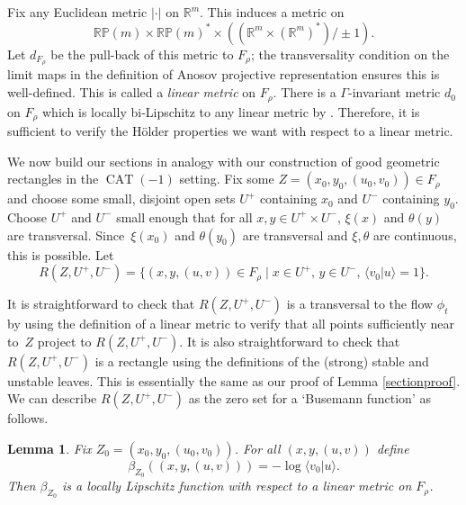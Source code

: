 \documentclass[10pt]{amsart}
\let\sep\mid
\newtheorem{lem}[thm]{Lemma}
\theoremstyle{definition}
\numberwithin{equation}{section}
\DeclareMathOperator{\CAT}{CAT}
\begin{document}
Fix any Euclidean metric $|\cdot|$ on $\mathbb{R}^m$. This induces a metric on\vspace*{-3pt}\enlargethispage{\baselineskip}%
\[ \mathbb{RP}(m) \times \mathbb{RP}(m)^* \times ((\mathbb{R}^m \times (\mathbb{R}^m)^*)/\pm1).\]
Let $d_{F_\rho}$ be the pull-back of this metric to $F_\rho$; the transversality condition on the limit maps in the definition of Anosov projective representation ensures this is well-defined. This is called a \emph{linear metric} on $F_\rho$. There is a $\Gamma$-invariant metric $d_0$ on $F_\rho$ which is locally bi-Lipschitz to any linear metric by \cite[Lem.\,5.2]{bcls}. Therefore, it is sufficient to verify the Hölder properties we want with respect to a linear metric.

We now build our sections in analogy with our construction of good geometric rectangles in the $\CAT(-1)$ setting. Fix some $Z = (x_0,y_0,(u_0,v_0)) \in F_\rho$ and choose some small, disjoint open sets $U^+$ containing $x_0$ and $U^-$ containing $y_0$. Choose $U^+$ and $U^-$ small enough that for all $x,y\in U^+\times U^-$, $\xi(x)$ and $\theta(y)$ are transversal. Since~$\xi(x_0)$ and $\theta(y_0)$ are transversal and $\xi, \theta$ are continuous, this is possible.
Let
\[ R(Z,U^+,U^-) = \{ (x,y,(u,v))\in F_\rho \sep x\in U^+,\, y\in U^-,\, \langle v_0 | u \rangle =1\}.\]

It is straightforward to check that $R(Z,U^+,U^-)$ is a transversal to the flow $\phi_t$ by using the definition of a linear metric to verify that all points sufficiently near to~$Z$ project to $R(Z,U^+,U^-)$. It is also straightforward to check that $R(Z,U^+,U^-)$ is a rectangle using the definitions of the (strong) stable and unstable leaves. This is essentially the same as our proof of Lemma \ref{sectionproof}. We can describe $R(Z,U^+,U^-)$ as the zero set for a `Busemann function' as follows.

\begin{lem}\label{lem:beta Lipschitz}
Fix $Z_0=(x_0,y_0,(u_0,v_0))$. For all $(x,y,(u,v))$ define\vspace*{-3pt}
\[ \beta_{Z_0}((x,y,(u,v))) = -\log\langle v_0 | u\rangle.\]
Then $\beta_{Z_0}$ is a locally Lipschitz function with respect to a linear metric on $F_\rho$.
\end{lem}
\end{document}

